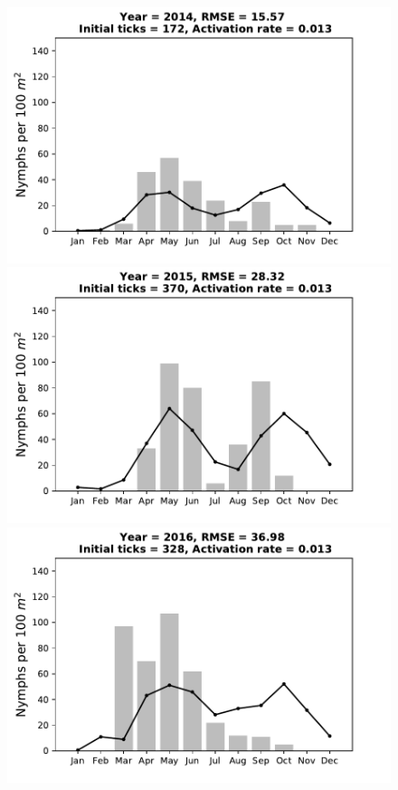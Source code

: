 \documentclass[a4paper, 11pt]{scrartcl}
\begin{document}
\begin{figure}[h!]
\begin{minipage}[c]{0.40\linewidth}
\end{minipage}
\begin{minipage}[c]{0.40\linewidth}
\includegraphics[width=\linewidth]{figures/s5/S5_2014}
\end{minipage}
\begin{minipage}[c]{0.40\linewidth}
\includegraphics[width=\linewidth]{figures/s5/S5_2015}
\end{minipage}
\begin{minipage}[c]{0.40\linewidth}
\includegraphics[width=\linewidth]{figures/s5/S5_2016}

\end{minipage}
\end{figure}
\end{document}
